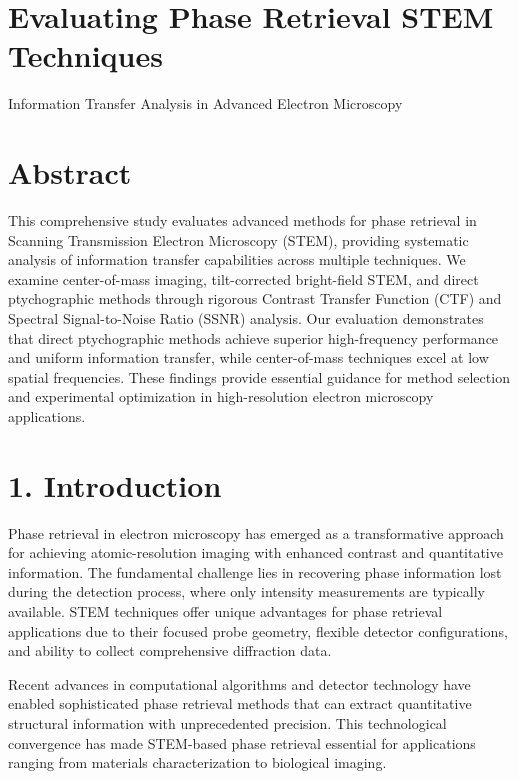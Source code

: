 \documentclass[
  letterpaper,
]{article}
\begin{document}

\chapter{Evaluating Phase Retrieval STEM
Techniques}\label{evaluating-phase-retrieval-stem-techniques}

Information Transfer Analysis in Advanced Electron Microscopy

\hfill\break

\label{abstract}

\chapter{Abstract}\label{abstract-1}

This comprehensive study evaluates advanced methods for phase retrieval
in Scanning Transmission Electron Microscopy (STEM), providing
systematic analysis of information transfer capabilities across multiple
techniques. We examine center-of-mass imaging, tilt-corrected
bright-field STEM, and direct ptychographic methods through rigorous
Contrast Transfer Function (CTF) and Spectral Signal-to-Noise Ratio
(SSNR) analysis. Our evaluation demonstrates that direct ptychographic
methods achieve superior high-frequency performance and uniform
information transfer, while center-of-mass techniques excel at low
spatial frequencies. These findings provide essential guidance for
method selection and experimental optimization in high-resolution
electron microscopy applications.


\chapter{1. Introduction}\label{introduction-1}

Phase retrieval in electron microscopy has emerged as a transformative
approach for achieving atomic-resolution imaging with enhanced contrast
and quantitative information. The fundamental challenge lies in
recovering phase information lost during the detection process, where
only intensity measurements are typically available. STEM techniques
offer unique advantages for phase retrieval applications due to their
focused probe geometry, flexible detector configurations, and ability to
collect comprehensive diffraction data.

Recent advances in computational algorithms and detector technology have
enabled sophisticated phase retrieval methods that can extract
quantitative structural information with unprecedented precision. This
technological convergence has made STEM-based phase retrieval essential
for applications ranging from materials characterization to biological
imaging.
\end{document}
